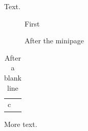 \documentclass{article}
\begin{document}
Text.
\begin{figure}[h]
\caption{First}
\end{figure}
\begin{figure}[h]
\centering
\begin{minipage}{0.4\linewidth}
\caption{In a minipage}
\end{minipage}
\caption{After the minipage}
\end{figure}
\begin{table}[h]
\begin{tabular}{l}
c \\
\end{tabular}

\caption{After a blank line}
\end{table}
More text.
\end{document}
